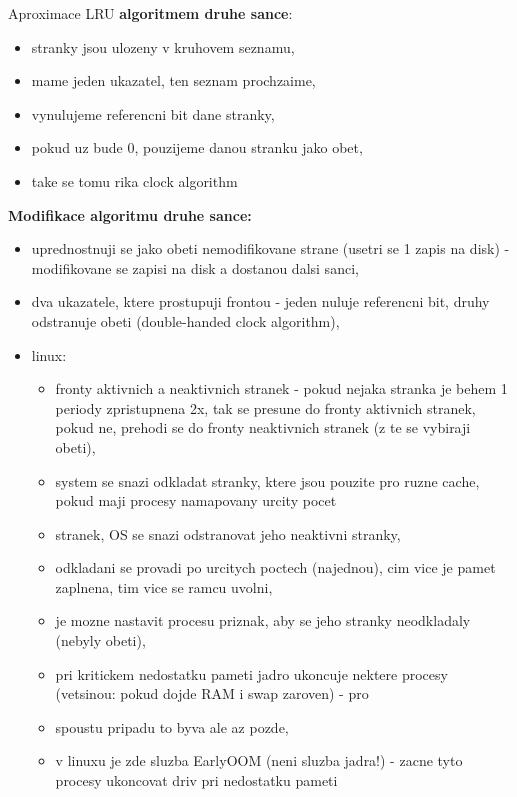 \documentclass[a4paper, 11pt]{article}
\begin{document}
Aproximace LRU \textbf{algoritmem druhe sance}:
\begin{itemize}
    \item stranky jsou ulozeny v kruhovem seznamu,
    \item mame jeden ukazatel, ten seznam prochzaime,
    \item vynulujeme referencni bit dane stranky,
    \item pokud uz bude 0, pouzijeme danou stranku jako obet,
    \item take se tomu rika clock algorithm \\
\end{itemize}

\textbf{Modifikace algoritmu druhe sance:}
\begin{itemize}
    \item uprednostnuji se jako obeti nemodifikovane strane (usetri se 1 zapis na disk) - modifikovane se zapisi na disk a dostanou dalsi sanci,
    \item dva ukazatele, ktere prostupuji frontou - jeden nuluje referencni bit, druhy odstranuje obeti (double-handed clock algorithm),
    \item linux:
    \begin{itemize}
        \item fronty aktivnich a neaktivnich stranek - pokud nejaka stranka je behem 1 periody zpristupnena 2x, tak se presune do fronty aktivnich stranek, pokud ne, prehodi se do fronty neaktivnich stranek (z te se vybiraji obeti),
    \item system se snazi odkladat stranky, ktere jsou pouzite pro ruzne cache, pokud maji procesy namapovany urcity pocet \item stranek, OS se snazi odstranovat jeho neaktivni stranky,
    \item odkladani se provadi po urcitych poctech (najednou), cim vice je pamet zaplnena, tim vice se ramcu uvolni,
    \item je mozne nastavit procesu priznak, aby se jeho stranky neodkladaly (nebyly obeti),
    \item pri kritickem nedostatku pameti jadro ukoncuje nektere procesy (vetsinou: pokud dojde RAM i swap zaroven) - pro \item spoustu pripadu to byva ale az pozde,
    \item v linuxu je zde sluzba EarlyOOM (neni sluzba jadra!) - zacne tyto procesy ukoncovat driv pri nedostatku pameti \\
    \end{itemize}
\end{itemize}
\end{document}
